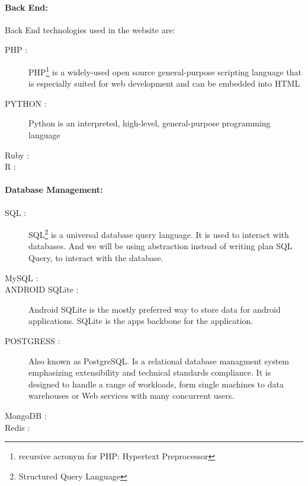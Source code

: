 \paragraph{Back End:}
Back End technologies used in the website are:
\begin{description}
\item[PHP : ] PHP\footnote{recursive acronym for PHP: Hypertext Preprocessor} is a widely-used open source general-purpose scripting language that is especially suited for web development and can be embedded into HTML
\item[PYTHON : ] Python is an interpreted, high-level, general-purpose programming language
\item[Ruby :]
\item[R :]

\end{description}

\paragraph{Database Management:}
\begin{description}
\item[SQL : ] SQL\footnote{Structured Query Language} is a universal database query language. It is used to interact with databases. And we will be using abstraction instead of writing plan SQL Query, to interact with the database.
\item[MySQL :]
\item[ANDROID SQLite : ] Android SQLite is the mostly preferred way to store data for android applications. SQLite is the apps backbone for the application. 
\item[POSTGRESS : ] Also known as PostgreSQL. Is a relational database managment system emphasizing extensibility and technical standards compliance. It is designed to handle a range of workloads, form single machines to data warehouses or Web services with many concurrent users.
\item[MongoDB :]
\item[Redis :]
\end{description}

